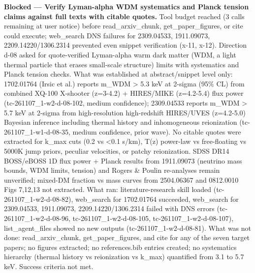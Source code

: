 \documentclass[11pt,a4paper]{article}
\begin{document}
\textbf{Blocked --- Verify Lyman-alpha WDM systematics and Planck tension claims against full texts with citable quotes.} Tool budget reached (3 calls remaining at user notice) before read\_arxiv\_chunk, get\_paper\_figures, or cite could execute; web\_search DNS failures for 2309.04533, 1911.09073, 2209.14220/1306.2314 prevented even snippet verification (x-11, x-12). Direction d-08 asked for quote-verified Lyman-alpha warm dark matter (WDM, a light thermal particle that erases small-scale structure) limits with systematics and Planck tension checks. What was established at abstract/snippet level only: 1702.01764 (Irsic et al.) reports m\_WDM \textgreater{} 5.3 keV at 2-sigma (95\% CL) from combined XQ-100 X-shooter (z=3-4.2) + HIRES/MIKE (z=4.2-5.4) flux power (tc-261107\_1-w2-d-08-102, medium confidence); 2309.04533 reports m\_WDM \textgreater{} 5.7 keV at 2-sigma from high-resolution high-redshift HIRES/UVES (z=4.2-5.0) Bayesian inference including thermal history and inhomogeneous reionization (tc-261107\_1-w1-d-08-35, medium confidence, prior wave). No citable quotes were extracted for k\_max cuts (0.2 vs \textless{}0.1 s/km), T(z) power-law vs free-floating vs 5000K jump priors, peculiar velocities, or patchy reionization. SDSS DR14 BOSS/eBOSS 1D flux power + Planck results from 1911.09073 (neutrino mass bounds, WDM limits, tension) and Rogers \& Poulin re-analyses remain unverified; mixed-DM fraction vs mass curves from 2504.06367 and 0812.0010 Figs 7,12,13 not extracted. What ran: literature-research skill loaded (tc-261107\_1-w2-d-08-82), web\_search for 1702.01764 succeeded, web\_search for 2309.04533, 1911.09073, 2209.14220/1306.2314 failed with DNS errors (tc-261107\_1-w2-d-08-96, tc-261107\_1-w2-d-08-105, tc-261107\_1-w2-d-08-107), list\_agent\_files showed no new outputs (tc-261107\_1-w2-d-08-81). What was not done: read\_arxiv\_chunk, get\_paper\_figures, and cite for any of the seven target papers; no figures extracted; no references.bib entries created; no systematics hierarchy (thermal history vs reionization vs k\_max) quantified from 3.1 to 5.7 keV. Success criteria not met.
\end{document}
